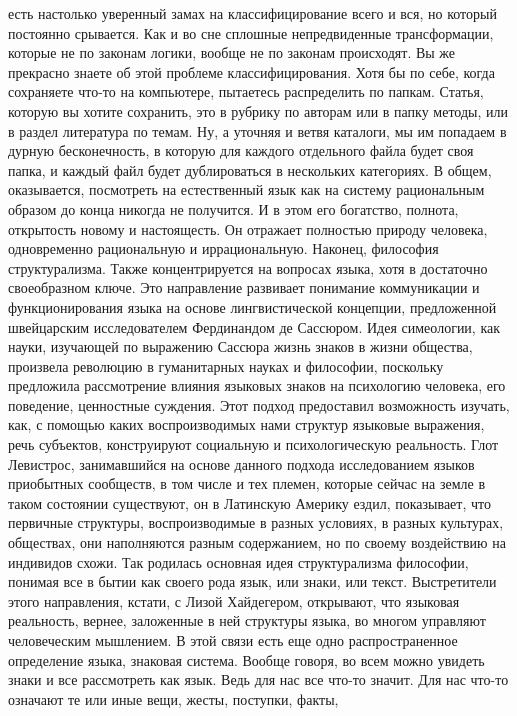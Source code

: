 есть настолько уверенный замах на классифицирование всего и вся, но который
постоянно срывается. Как и во сне сплошные непредвиденные трансформации, которые
не по законам логики, вообще не по законам происходят. Вы же прекрасно знаете об
этой проблеме классифицирования. Хотя бы по себе, когда сохраняете что-то на
компьютере, пытаетесь распределить по папкам. Статья, которую вы хотите
сохранить, это в рубрику по авторам или в папку методы, или в раздел литература
по темам. Ну, а уточняя и ветвя каталоги, мы им попадаем в дурную бесконечность,
в которую для каждого отдельного файла будет своя папка, и каждый файл будет
дублироваться в нескольких категориях. В общем, оказывается, посмотреть на
естественный язык как на систему рациональным образом до конца никогда не
получится. И в этом его богатство, полнота, открытость новому и настоящесть. Он
отражает полностью природу человека, одновременно рациональную и иррациональную.
Наконец, философия структурализма. Также концентрируется на вопросах языка, хотя
в достаточно своеобразном ключе. Это направление развивает понимание
коммуникации и функционирования языка на основе лингвистической концепции,
предложенной швейцарским исследователем Фердинандом де Сассюром. Идея
симеологии, как науки, изучающей по выражению Сассюра жизнь знаков в жизни
общества, произвела революцию в гуманитарных науках и философии, поскольку
предложила рассмотрение влияния языковых знаков на психологию человека, его
поведение, ценностные суждения. Этот подход предоставил возможность изучать,
как, с помощью каких воспроизводимых нами структур языковые выражения, речь
субъектов, конструируют социальную и психологическую реальность. Глот Левистрос,
занимавшийся на основе данного подхода исследованием языков приобытных
сообществ, в том числе и тех племен, которые сейчас на земле в таком состоянии
существуют, он в Латинскую Америку ездил, показывает, что первичные структуры,
воспроизводимые в разных условиях, в разных культурах, обществах, они
наполняются разным содержанием, но по своему воздействию на индивидов схожи. Так
родилась основная идея структурализма философии, понимая все в бытии как своего
рода язык, или знаки, или текст. Выстретители этого направления, кстати, с Лизой
Хайдегером, открывают, что языковая реальность, вернее, заложенные в ней
структуры языка, во многом управляют человеческим мышлением. В этой связи есть
еще одно распространенное определение языка, знаковая система. Вообще говоря, во
всем можно увидеть знаки и все рассмотреть как язык. Ведь для нас все что-то
значит. Для нас что-то означают те или иные вещи, жесты, поступки, факты,
